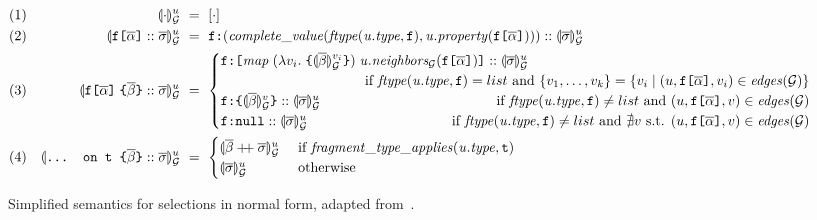 \begin{figure*}[t]
  \small
  \begin{flushright}
  \end{flushright}
  \centering
    \vspace{-1ex}
    \begin{align*}
    & (1) & \seval{\cdot}{u} &~=~ [\cdot] \\
    & (2) & \sevalu{\fld :: \sset} &~=~ 
    \resp{(\mathit{complete\_value(ftype(u.type, \fkey), u.property(\fld))})} :: \sevalu{\sset} \\
    & (3) & %
    \sevalu{\nfld{\overline{\beta}} :: \sset} &~=~
    \begin{cases}
      \resp{\texttt{[} \mathit{map}\; (\lambda v_{i}.\; \texttt{\{} \seval{\overline{\beta}}{v_{i}} \texttt{\}})\; 
      \mathit{u.neighbors_{\graph}(\fld)} \texttt{]}} :: \sevalu{\sset}  \\
     \hfill \text{ if } 
            \mathit{ftype(u.type, \fkey)} = list \text{ and } \{v_{1}, \ldots, v_{k}\} = 
        \{v_{i} \mid (u, \fld, v_{i}) \in \mathit{edges}(\graph)\} \\
      \resp{\texttt{\{}\seval{\subqueries{\beta}}{v}\texttt{\}}} :: \sevalu{\sset}  
      \hfill \text{ if } 
        \mathit{ftype(u.type, \fkey)}  \neq list \text{ and } (u, \fld, v) \in \mathit{edges}(\graph) \\
      \resp{\nval} :: \sevalu{\sset} 
     \qquad \qquad \qquad \qquad \qquad
    \text{ if } \mathit{ftype(u.type, \fkey)}  \neq list  \text{ and } \nexists v \text{ s.t. }  (u, \fld, v) \in \mathit{edges}(\graph) \\
    \end{cases}\\
    & (4) & \sevalu{\ifrag{t}{\overline{\beta}}:: \sset} &~=~ \begin{cases}
    \sevalu{\overline{\beta} \mdoubleplus \sset} & 
  	\text{ if }\mathit{fragment\_type\_applies (u.type, \texttt{t})}\\
    \sevalu{\sset} & \text{ otherwise}
    \end{cases}
    \end{align*}
    \caption{Simplified semantics for selections in normal form,
      adapted from~\cite{gqlph}.} 
    \label{fig:simpl_semantics}
\end{figure*}




